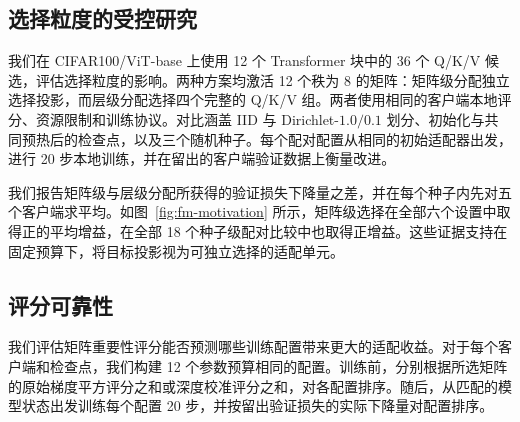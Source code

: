 \documentclass[10pt,conference,letterpaper]{IEEEtran}
\newcommand{\method}{FedMATRIX-LoRA}
\begin{document}
\begin{table}[!t]
\centering
\caption{达到各最强基线的峰值准确率所需的资源；正的节省率有利于 \method{}。}
\label{tab:time-to-quality}
\setlength{\tabcolsep}{2.2pt}
\end{table}

\subsection{选择粒度的受控研究}
\label{sec:fm-granularity-study}
我们在 CIFAR100/ViT-base 上使用 12 个 Transformer 块中的 36 个 Q/K/V 候选，评估选择粒度的影响。两种方案均激活 12 个秩为 8 的矩阵：矩阵级分配独立选择投影，而层级分配选择四个完整的 Q/K/V 组。两者使用相同的客户端本地评分、资源限制和训练协议。对比涵盖 IID 与 Dirichlet-$1.0/0.1$ 划分、初始化与共同预热后的检查点，以及三个随机种子。每个配对配置从相同的初始适配器出发，进行 20 步本地训练，并在留出的客户端验证数据上衡量改进。

我们报告矩阵级与层级分配所获得的验证损失下降量之差，并在每个种子内先对五个客户端求平均。如图~\ref{fig:fm-motivation} 所示，矩阵级选择在全部六个设置中取得正的平均增益，在全部 18 个种子级配对比较中也取得正增益。这些证据支持在固定预算下，将目标投影视为可独立选择的适配单元。

\subsection{评分可靠性}\label{sec:fm-score-study}
我们评估矩阵重要性评分能否预测哪些训练配置带来更大的适配收益。对于每个客户端和检查点，我们构建 12 个参数预算相同的配置。训练前，分别根据所选矩阵的原始梯度平方评分之和或深度校准评分之和，对各配置排序。随后，从匹配的模型状态出发训练每个配置 20 步，并按留出验证损失的实际下降量对配置排序。
\end{document}
